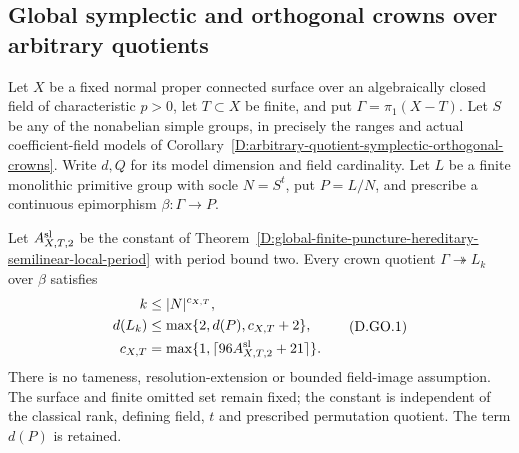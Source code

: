 \subsection{Global symplectic and orthogonal crowns over arbitrary quotients}

\begin{corollary}
\label{D:global-arbitrary-quotient-symplectic-orthogonal-crowns}
Let $X$ be a fixed normal proper connected surface over an
algebraically closed field of characteristic $p>0$, let
$T\subset X$ be finite, and put $\Gamma=\pi_1(X-T)$.
Let $S$ be any of the nonabelian simple groups, in precisely
the ranges and actual coefficient-field models of
Corollary~\ref{D:arbitrary-quotient-symplectic-orthogonal-crowns}.
Write $d,Q$ for its model dimension and field cardinality.
Let $L$ be a finite monolithic primitive group with socle
$N=S^t$, put $P=L/N$, and prescribe a continuous epimorphism
$\beta:\Gamma\to P$.

Let $A^{\rm sl}_{X,T,2}$ be the constant of
Theorem~\ref{D:global-finite-puncture-hereditary-semilinear-local-period}
with period bound two. Every crown quotient
$\Gamma\twoheadrightarrow L_k$ over $\beta$ satisfies
\[
 \begin{aligned}
 k&\le |N|^{c_{X,T}},\\
 d(L_k)&\le\max\{2,d(P),c_{X,T}+2\},\\
 c_{X,T}&=\max\{1,\lceil96A^{\rm sl}_{X,T,2}+21\rceil\}.
 \end{aligned}                                               \tag{D.GO.1}
\]
There is no tameness, resolution-extension or bounded
field-image assumption. The surface and finite omitted
set remain fixed; the constant is independent of the
classical rank, defining field, $t$ and prescribed
permutation quotient. The term $d(P)$ is retained.
\end{corollary}

